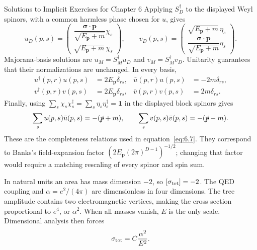 \begin{bankssolutions}{Solutions to Implicit Exercises for Chapter 6}
Applying \(S_D^\dagger\) to the displayed Weyl spinors, with a common
harmless phase chosen for \(u\), gives
\begin{equation*}
 u_D(p,s)=\begin{pmatrix}\dfrac{\boldsymbol\sigma\cdot\mathbf p}{\sqrt{E_{\mathbf p}+m}}\chi_s\\
 \sqrt{E_{\mathbf p}+m}\,\chi_s
 \end{pmatrix},
 \qquad
 v_D(p,s)=\begin{pmatrix}
 \sqrt{E_{\mathbf p}+m}\,\eta_s\\
 \dfrac{\boldsymbol\sigma\cdot\mathbf p}{\sqrt{E_{\mathbf p}+m}}\eta_s
 \end{pmatrix}.
\end{equation*}
Majorana-basis solutions are \(u_M=S_M^\dagger u_D\) and
\(v_M=S_M^\dagger v_D\).  Unitarity guarantees that their normalizations
are unchanged.  In every basis,
\begin{align*}
 u^\dagger(p,r)u(p,s)&=2E_{\mathbf p}\delta_{rs},
 &\bar u(p,r)u(p,s)&=-2m\delta_{rs},\\
 v^\dagger(p,r)v(p,s)&=2E_{\mathbf p}\delta_{rs},
 &\bar v(p,r)v(p,s)&=2m\delta_{rs}.
\end{align*}
Finally, using \(\sum_s\chi_s\chi_s^\dagger
=\sum_s\eta_s\eta_s^\dagger=\mathbf1\)
in the displayed block spinors gives
\begin{equation*}
 \sum_su(p,s)\bar u(p,s)=-(\slashed p+m),
 \qquad
 \sum_sv(p,s)\bar v(p,s)=-(\slashed p-m).
\end{equation*}
These are the completeness relations used in equation~\eqref{eq:6.7}.
They correspond to Banks's field-expansion factor
\((2E_{\mathbf p}(2\pi)^{D-1})^{-1/2}\); changing that factor would require a matching
rescaling of every spinor and spin sum.

In natural units an area has mass dimension \(-2\), so
\([\sigma_{\rm tot}]=-2\).  The QED coupling and
\(\alpha=e^2/(4\pi)\) are dimensionless in four dimensions.  The tree
amplitude contains two electromagnetic vertices, making the cross section
proportional to \(e^4\), or \(\alpha^2\).  When all masses vanish, \(E\)
is the only scale.  Dimensional analysis then forces
\begin{equation*}
 \sigma_{\rm tot}=C\frac{\alpha^2}{E^2}.
\end{equation*}


\end{bankssolutions}
